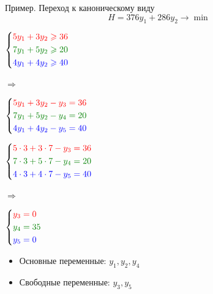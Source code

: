 \documentclass[unicode,11pt,notheorems,xcolor=table]{beamer}
\begin{document}
\begin{frame}{Пример. Переход к каноническому виду}
$$
	H = 376y_1+286y_2 \to \min
$$

\begin{minipage}{0.25\textwidth}
 $\left\lbrace
  \begin{aligned}
    \color{red} 5y_1+3y_2 & \color{red}\geqslant 36\\
    \color{green!50!black}7y_1+5y_2 & \color{green!50!black} \geqslant 20\\
    \color{blue}  4y_1+4y_2 &\color{blue}\geqslant 40\\
  \end{aligned}  \right.
 $
\end{minipage}
\hfill $\Longrightarrow$\hfill
\begin{minipage}{0.4\textwidth}
 $\left\lbrace
  \begin{aligned}
    \color{red} 5y_1+3y_2 - y_3 & \color{red} = 36\\
    \color{green!50!black}7y_1+5y_2-y_4 & \color{green!50!black} = 20\\
    \color{blue}  4y_1+4y_2-y_5 &\color{blue}= 40\\
  \end{aligned}  \right.
 $
\end{minipage}

\bigskip
{}

\begin{minipage}{0.25\textwidth}
 $\left\lbrace
  \begin{aligned}
    \color{red} 5\cdot 3+3 \cdot 7- y_3 & \color{red} = 36\\
    \color{green!50!black}7\cdot 3+5\cdot 7-y_4 & \color{green!50!black} = 20\\
    \color{blue}  4\cdot 3 + 4\cdot 7-y_5 &\color{blue}= 40\\
  \end{aligned}  \right.
 $
\end{minipage}
\hfill $\Longrightarrow$\hfill
\begin{minipage}{0.4\textwidth}
 $\left\lbrace
  \begin{aligned}
    \color{red} y_3 & \color{red} = 0\\
    \color{green!50!black} y_4 & \color{green!50!black} = 35\\
    \color{blue}  y_5 &\color{blue}= 0\\
  \end{aligned}  \right.
 $
\end{minipage}

\bigskip
{}
\begin{itemize}
\item 
	Основные переменные: $y_1,y_2,y_4$
\item 
	Свободные переменные: $y_3,y_5$
\end{itemize}


\end{frame}
\end{document}

